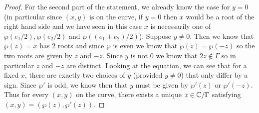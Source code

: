 \begin{proof}
    For the second part of the statement, we already know the case for $y = 0$ (in particular since $(x, y)$ is on the curve, if $y = 0$ then $x$ would be a root of the right hand side and we have seen in this case $x$ is necessarily one of $\wp(e_1/2), \wp(e_2/2)$ and $\wp((e_1 + e_2)/2)$). Suppose $y \neq 0$. Then we know that $\wp(z) = x$ has 2 roots and since $\wp$ is even we know that $\wp(z) = \wp(-z)$ so the two roots are given by $z$ and $-z$. Since $y$ is not 0 we know that $2z \notin \Gamma$ so in particular $z$ and $-z$ are distinct. Looking at the equation, we can see that for a fixed $x$, there are exactly two choices of $y$ (provided $y \neq 0$) that only differ by a sign. Since $\wp'$ is odd, we know then that $y$ must be given by $\wp'(z)$ or $\wp'(-z)$. Thus for every $(x, y)$ on the curve, there exists a unique $z \in \mathbb{C}/\Gamma$ satisfying $(x, y) = (\wp(z), \wp'(z))$.
\end{proof}

